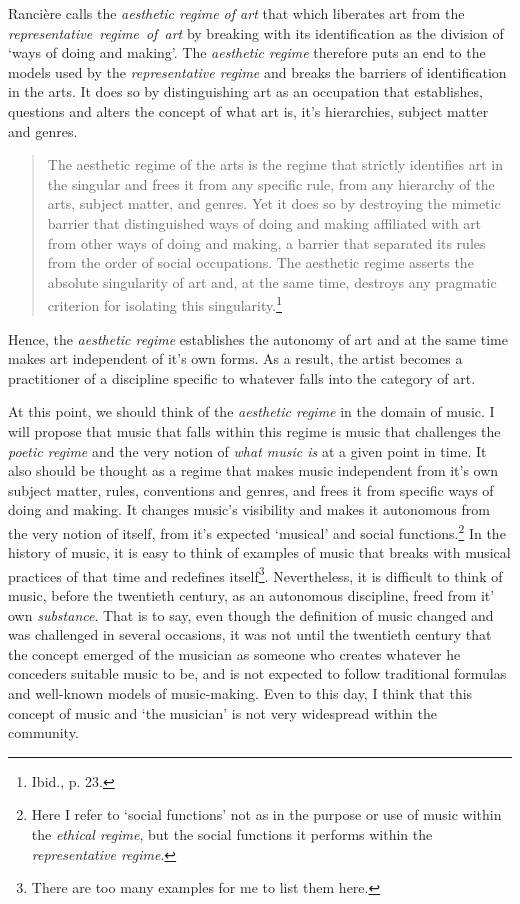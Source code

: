 Ranci\`{e}re calls the \emph{aesthetic regime of art} that which liberates art from the \mbox{\emph{representative regime of art}} by breaking with its identification as the division of `ways of doing and making'. The \emph{aesthetic regime} therefore puts an end to the models used by the \emph{representative regime} and breaks the barriers of identification in the arts. It does so by distinguishing art as an occupation that establishes, questions and alters the concept of what art is, it's hierarchies, subject matter and genres. 
\begin{quote}
The aesthetic regime of the arts is the regime that strictly identifies art in the singular and frees it from any specific rule, from any hierarchy of the arts, subject matter, and genres. Yet it does so by destroying the mimetic barrier that distinguished ways of doing and making affiliated with art from other ways of doing and making, a barrier that separated its rules from the order of social occupations. The aesthetic regime asserts the absolute singularity of art and, at the same time, destroys any pragmatic criterion for isolating this singularity.\footnote{Ibid., p. 23.}
\end{quote}
Hence, the \emph{aesthetic regime} establishes the autonomy of art and at the same time makes art independent of it's own forms. As a result, the artist becomes a practitioner of a discipline specific to whatever falls into the category of art. 

At this point, we should think of the \emph{aesthetic regime} in the domain of music. I will propose that music that falls within this regime is music that challenges the \emph{poetic regime} and the very notion of \emph{what music is} at a given point in time. It also should be thought as a regime that makes music independent from it's own subject matter, rules, conventions and genres, and frees it from specific ways of doing and making. It changes music's visibility and makes it autonomous from the very notion of itself, from it's expected `musical' and social functions.\footnote{Here I refer to `social functions' not as in the purpose or use of music within the \emph{ethical regime}, but the social functions it performs within the \emph{representative regime}.} In the history of music, it is easy to think of examples of music that breaks with musical practices of that time and redefines itself\footnote{There are too many examples for me to list them here.}. Nevertheless, it is difficult to think of music, before the twentieth century, as an autonomous discipline, freed from it' own \emph{substance}. That is to say, even though the definition of music changed and was challenged in several occasions, it was not until the twentieth century that the concept emerged of the musician as someone who creates whatever he conceders suitable music to be, and is not expected to follow traditional formulas and well-known models of music-making. Even to this day, I think that this concept of music and `the musician' is not very widespread within the community.  

